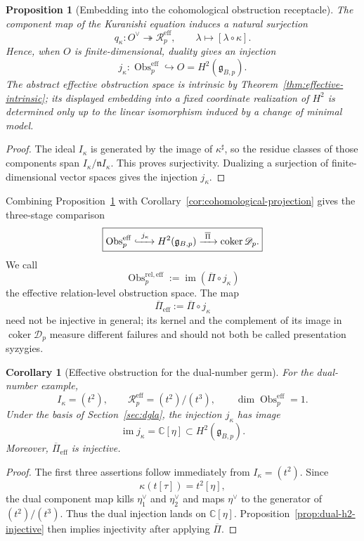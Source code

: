 \documentclass[11pt]{amsart}
\newtheorem{proposition}[theorem]{Proposition}
\newtheorem{corollary}[theorem]{Corollary}
\newcommand{\coker}{\operatorname{coker}}
\newcommand{\Obs}{\operatorname{Obs}}
\newcommand{\cD}{\mathscr D}
\newcommand{\C}{\mathbb C}
\newcommand{\ghoch}{\mathfrak g}
\begin{document}
\begin{proposition}[Embedding into the cohomological obstruction receptacle]\label{prop:effective-into-h2}
The component map of the Kuranishi equation induces a natural surjection
\[
q_\kappa:O^\vee\twoheadrightarrow\mathscr R^{\mathrm{eff}}_p,
\qquad
\lambda\longmapsto[\lambda\circ\kappa].
\]
Hence, when $O$ is finite-dimensional, duality gives an injection
\[
j_\kappa:\Obs^{\mathrm{eff}}_p\hookrightarrow O=H^2(\ghoch_{B,p}).
\]
The abstract effective obstruction space is intrinsic by Theorem~\ref{thm:effective-intrinsic}; its displayed embedding into a fixed coordinate realization of $H^2$ is determined only up to the linear isomorphism induced by a change of minimal model.
\end{proposition}

\begin{proof}
The ideal $I_\kappa$ is generated by the image of $\kappa^\sharp$, so the residue classes of those components span $I_\kappa/\mathfrak nI_\kappa$.  This proves surjectivity.  Dualizing a surjection of finite-dimensional vector spaces gives the injection $j_\kappa$.
\end{proof}

Combining Proposition~\ref{prop:effective-into-h2} with Corollary~\ref{cor:cohomological-projection} gives the three-stage comparison
\[
\boxed{
\Obs^{\mathrm{eff}}_p
\xhookrightarrow{\ j_\kappa\ }
H^2(\ghoch_{B,p})
\xrightarrow{\ \overline\Pi\ }
\coker\cD_p.
}
\]
We call
\[
\Obs^{\mathrm{rel,eff}}_p
:=
\operatorname{im}(\overline\Pi\circ j_\kappa)
\]
the effective relation-level obstruction space.  The map
\[
\overline\Pi_{\mathrm{eff}}
:=
\overline\Pi\circ j_\kappa
\]
need not be injective in general; its kernel and the complement of its image in $\coker\cD_p$ measure different failures and should not both be called presentation syzygies.

\begin{corollary}[Effective obstruction for the dual-number germ]\label{cor:dual-effective}
For the dual-number example,
\[
I_\kappa=(t^2),
\qquad
\mathscr R^{\mathrm{eff}}_p
=(t^2)/(t^3),
\qquad
\dim\Obs^{\mathrm{eff}}_p=1.
\]
Under the basis of Section~\ref{sec:dgla}, the injection $j_\kappa$ has image
\[
\operatorname{im}j_\kappa=\C[\eta]\subset H^2(\ghoch_{B,p}).
\]
Moreover, $\overline\Pi_{\mathrm{eff}}$ is injective.
\end{corollary}

\begin{proof}
The first three assertions follow immediately from $I_\kappa=(t^2)$.  Since
\[
\kappa(t[\tau])=t^2[\eta],
\]
the dual component map kills $\eta_1^\vee$ and $\eta_2^\vee$ and maps $\eta^\vee$ to the generator of $(t^2)/(t^3)$.  Thus the dual injection lands on $\C[\eta]$.  Proposition~\ref{prop:dual-h2-injective} then implies injectivity after applying $\overline\Pi$.
\end{proof}
\end{document}
